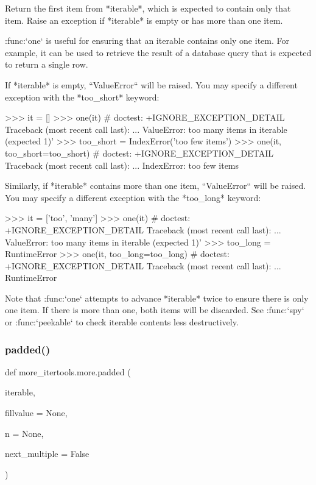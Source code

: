 \begin{DoxyVerb}Return the first item from *iterable*, which is expected to contain only
that item. Raise an exception if *iterable* is empty or has more than one
item.

:func:`one` is useful for ensuring that an iterable contains only one item.
For example, it can be used to retrieve the result of a database query
that is expected to return a single row.

If *iterable* is empty, ``ValueError`` will be raised. You may specify a
different exception with the *too_short* keyword:

    >>> it = []
    >>> one(it)  # doctest: +IGNORE_EXCEPTION_DETAIL
    Traceback (most recent call last):
    ...
    ValueError: too many items in iterable (expected 1)'
    >>> too_short = IndexError('too few items')
    >>> one(it, too_short=too_short)  # doctest: +IGNORE_EXCEPTION_DETAIL
    Traceback (most recent call last):
    ...
    IndexError: too few items

Similarly, if *iterable* contains more than one item, ``ValueError`` will
be raised. You may specify a different exception with the *too_long*
keyword:

    >>> it = ['too', 'many']
    >>> one(it)  # doctest: +IGNORE_EXCEPTION_DETAIL
    Traceback (most recent call last):
    ...
    ValueError: too many items in iterable (expected 1)'
    >>> too_long = RuntimeError
    >>> one(it, too_long=too_long)  # doctest: +IGNORE_EXCEPTION_DETAIL
    Traceback (most recent call last):
    ...
    RuntimeError

Note that :func:`one` attempts to advance *iterable* twice to ensure there
is only one item. If there is more than one, both items will be discarded.
See :func:`spy` or :func:`peekable` to check iterable contents less
destructively.\end{DoxyVerb}
 \mbox{\label{namespacemore__itertools_1_1more_a8eb43aaef11e295f0f564a2b276d5908}} 
\subsubsection{\texorpdfstring{padded()}{padded()}}
{\footnotesize\ttfamily def more\+\_\+itertools.\+more.\+padded (\begin{DoxyParamCaption}\item[{}]{iterable,  }\item[{}]{fillvalue = {\ttfamily None},  }\item[{}]{n = {\ttfamily None},  }\item[{}]{next\+\_\+multiple = {\ttfamily False} }\end{DoxyParamCaption})}

